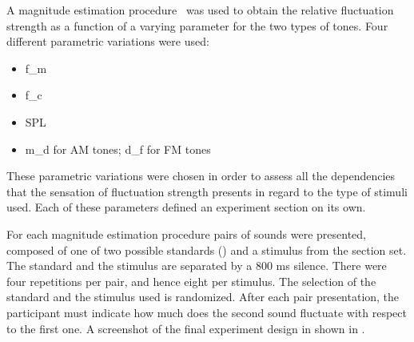 \documentclass[../main.tex]{subfiles}
\begin{document}
A magnitude estimation procedure~\cite[pp.~9]{Fastl2007Psychoacoustics} was used
to obtain the relative fluctuation strength as a function of a varying parameter
for the two types of tones. Four different parametric variations were used:
\begin{itemize}
  \item \Gls{f_m}
  \item \Gls{f_c}
  \item \Gls{SPL}
  \item \Gls{m_d} for \gls{AM} tones; \gls{d_f} for \gls{FM} tones
\end{itemize}
These parametric variations were chosen in order to assess all the dependencies
that the sensation of fluctuation strength presents in regard to the type of
stimuli used. Each of these parameters defined an experiment section on its own.

For each magnitude estimation procedure pairs of sounds were presented, composed
of one of two possible standards () and a stimulus from the
section set. The standard and the stimulus are separated by a 800 ms silence.
There were four repetitions per pair, and hence eight per stimulus. The
selection of the standard and the stimulus used is randomized. After each
pair presentation, the participant must indicate how much does the second
sound fluctuate with respect to the first one. A screenshot of the final
experiment design in shown in .
\end{document}
